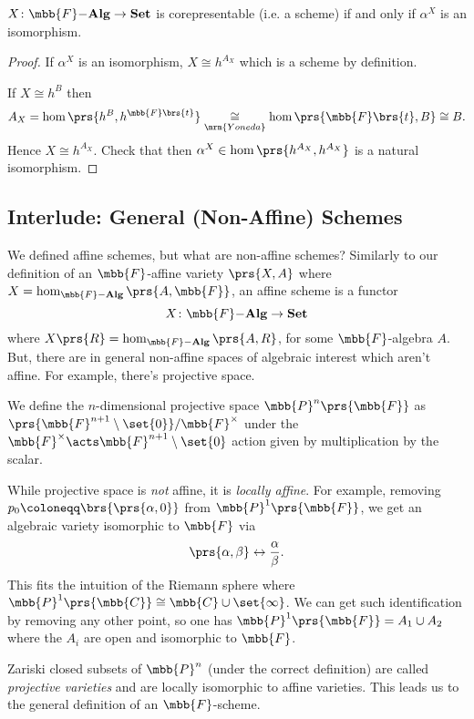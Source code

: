 \documentclass[10pt,a4paper,twoside,openany,hidelinks]{book}
\begin{document}
\begin{proposition}
$X \colon \mbb{F}\mbf{-Alg} \to \mbf{Set}$ is corepresentable (i.e. a scheme) if and only if $\alpha^X$ is an isomorphism.
\end{proposition}

\begin{proof}
If $\alpha^X$ is an isomorphism, $X \cong h^{A_X}$ which is a scheme by definition.

If $X \cong h^B$ then
\[A_X = \hom\prs{h^B, h^{\mbb{F}\brs{t}}} \underset{\mrm{Yoneda}}{\cong} \hom\prs{\mbb{F}\brs{t}, B} \cong B \text{.}\]
Hence $X \cong h^{A_X}$. Check that then $\alpha^X \in \hom\prs{h^{A_X}, h^{A_X}}$ is a natural isomorphism.
\end{proof}


\subsection{Interlude: General (Non-Affine) Schemes}

We defined affine schemes, but what are non-affine schemes?
Similarly to our definition of an $\mbb{F}$-affine variety $\prs{X,A}$ where $X = \hom_{\mbb{F}\mbf{-Alg}}\prs{A,\mbb{F}}$, an affine scheme is a functor
\[X \colon \mbb{F}\mbf{-Alg} \to \mbf{Set}\]
where $X\prs{R} = \hom_{\mbb{F}\mbf{-Alg}}\prs{A,R}$, for some $\mbb{F}$-algebra $A$.
But, there are in general non-affine spaces of algebraic interest which aren't affine. For example, there's projective space.

\begin{example}
We define the $n$-dimensional projective space $\mbb{P}^n\prs{\mbb{F}}$ as $\prs{\mbb{F}^{n+1} \setminus \set{0}} / \mbb{F}^\times$ under the $\mbb{F}^\times \acts \mbb{F}^{n+1} \setminus \set{0}$ action given by multiplication by the scalar.

While projective space is \emph{not} affine, it is \emph{locally affine}.
For example, removing $p_0 \coloneqq \brs{\prs{\alpha, 0}}$ from $\mbb{P}^1\prs{\mbb{F}}$, we get an algebraic variety isomorphic to $\mbb{F}$ via
\[\prs{\alpha, \beta} \leftrightarrow \frac{\alpha}{\beta} \text{.}\]
This fits the intuition of the Riemann sphere where $\mbb{P}^1\prs{\mbb{C}} \cong \mbb{C} \cup \set{\infty}$.
We can get such identification by removing any other point, so one has $\mbb{P}^1\prs{\mbb{F}} = A_1 \cup A_2$ where the $A_i$ are open and isomorphic to $\mbb{F}$.

Zariski closed subsets of $\mbb{P}^n$ (under the correct definition) are called \emph{projective varieties} and are locally isomorphic to affine varieties.
This leads us to the general definition of an $\mbb{F}$-scheme.
\end{example}
\end{document}
